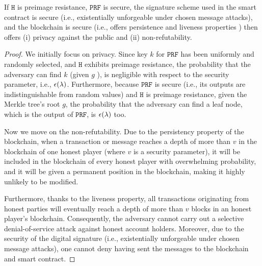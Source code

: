  \vspace{-2mm}
\begin{theorem}
If  $\mathtt{H}$ is preimage resistance, $\mathtt{PRF}$ is secure, the signature scheme used in the smart contract is secure (i.e., existentially unforgeable under chosen message attacks), and the blockchain is secure (i.e., offers persistence and liveness properties \cite{GarayKL15}) then \zspa offers (i) privacy against the public and (ii) non-refutability. 
\end{theorem}
 
 

\begin{proof}
We initially focus on privacy. Since key $k$ for $\mathtt{PRF}$ has been  uniformly and randomly selected, and $\mathtt{H}$ exhibits preimage resistance, the probability that the adversary can find $k$ (given $g$ ), is negligible with respect to the security parameter, i.e., $\epsilon(\lambda)$. Furthermore, because $\mathtt{PRF}$ is secure (i.e., its outputs are indistinguishable from random values) and  $\mathtt{H}$ is preimage resistance, given the Merkle tree's root $g$, the probability that the adversary can find a leaf node, which is the output of $\mathtt{PRF}$, is $\epsilon(\lambda)$ too. 



Now we move on the non-refutability. Due to the persistency property of the blockchain, when a transaction or message reaches a depth of more than $v$ in the blockchain of one honest player (where $v$ is a security parameter),  it will be included in the blockchain of every honest player with overwhelming probability, and it will be given a permanent position in the blockchain, making it highly unlikely to be modified.


Furthermore, thanks to the liveness property, all transactions originating from honest parties will eventually reach a depth of more than $v$ blocks in an honest player's blockchain. Consequently, the adversary cannot carry out a selective denial-of-service attack against honest account holders. Moreover, due to the security of the digital signature (i.e., existentially unforgeable under chosen message attacks), one cannot deny having sent the messages to the blockchain and smart contract.
\end{proof}
